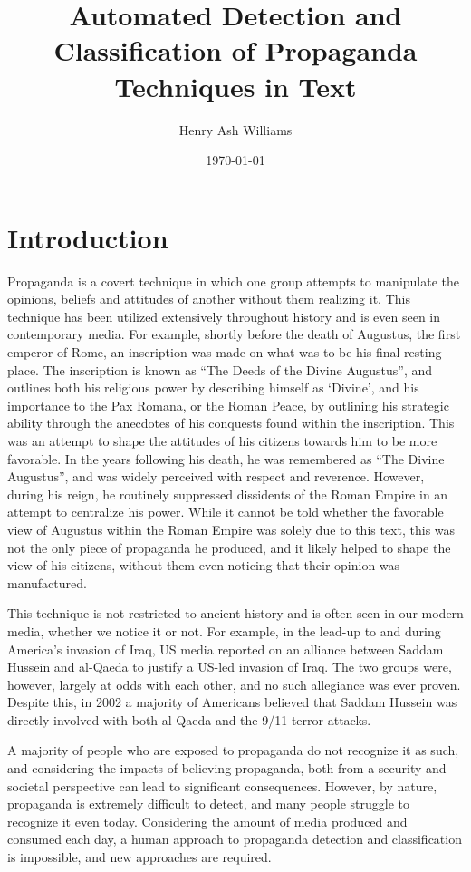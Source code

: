 \documentclass[twocolumn]{article}
\title{Automated Detection and Classification of Propaganda Techniques in Text}
\author{Henry Ash Williams}
\date{\today}
\begin{document}
\maketitle

\section{Introduction}

Propaganda is a covert technique in which one group attempts to manipulate the opinions, beliefs and attitudes of another without them realizing it. This technique has been utilized extensively throughout history and is even seen in contemporary media. For example, shortly before the death of Augustus, the first emperor of Rome, an inscription was made on what was to be his final resting place. The inscription is known as ``The Deeds of the Divine Augustus'', and outlines both his religious power by describing himself as `Divine', and his importance to the Pax Romana, or the Roman Peace, by outlining his strategic ability through the anecdotes of his conquests found within the inscription. This was an attempt to shape the attitudes of his citizens towards him to be more favorable. In the years following his death, he was remembered as ``The Divine Augustus'', and was widely perceived with respect and reverence. However, during his reign, he routinely suppressed dissidents of the Roman Empire in an attempt to centralize his power. While it cannot be told whether the favorable view of Augustus within the Roman Empire was solely due to this text, this was not the only piece of propaganda he produced, and it likely helped to shape the view of his citizens, without them even noticing that their opinion was manufactured. 

This technique is not restricted to ancient history and is often seen in our modern media, whether we notice it or not. For example, in the lead-up to and during America's invasion of Iraq, US media reported on an alliance between Saddam Hussein and al-Qaeda to justify a US-led invasion of Iraq. The two groups were, however, largely at odds with each other, and no such allegiance was ever proven. Despite this, in 2002 a majority of Americans believed that Saddam Hussein was directly involved with both al-Qaeda and the 9/11 terror attacks. 

A majority of people who are exposed to propaganda do not recognize it as such, and considering the impacts of believing propaganda, both from a security and societal perspective can lead to significant consequences. However, by nature, propaganda is extremely difficult to detect, and many people struggle to recognize it even today. Considering the amount of media produced and consumed each day, a human approach to propaganda detection and classification is impossible, and new approaches are required. 
\end{document}
